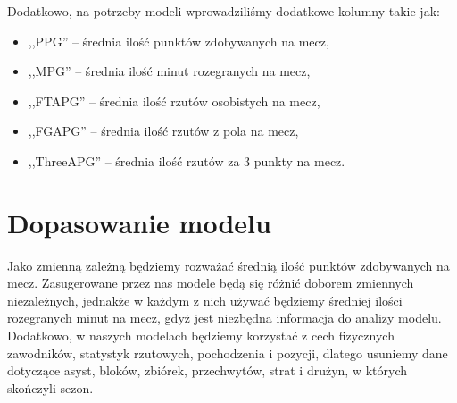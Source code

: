 \documentclass[11pt,a4paper]{article}
\begin{document}
	Dodatkowo, na potrzeby modeli wprowadziliśmy dodatkowe kolumny takie jak:
\begin{itemize}	
	\item ,,PPG'' -- średnia ilość punktów zdobywanych na mecz,
	\item ,,MPG'' -- średnia ilość minut rozegranych na mecz,
	\item ,,FTAPG'' -- średnia ilość rzutów osobistych na mecz,
	\item ,,FGAPG'' -- średnia ilość rzutów z pola na mecz,
	\item ,,ThreeAPG'' -- średnia ilość rzutów za 3 punkty na mecz.
\end{itemize}
	
\section{Dopasowanie modelu}
Jako zmienną zależną będziemy rozważać średnią ilość punktów zdobywanych na mecz. Zasugerowane przez nas modele będą się różnić doborem zmiennych niezależnych, jednakże w każdym z nich używać będziemy średniej ilości rozegranych minut na mecz, gdyż jest niezbędna informacja do analizy modelu. Dodatkowo, w naszych modelach będziemy korzystać z cech fizycznych zawodników, statystyk rzutowych, pochodzenia i pozycji, dlatego usuniemy dane dotyczące asyst, bloków, zbiórek, przechwytów, strat i drużyn, w których skończyli sezon.
\end{document}
